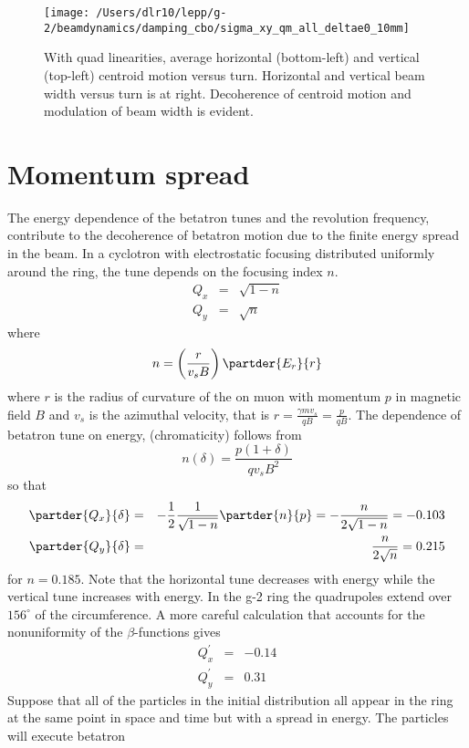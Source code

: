 \documentclass[10pt]{report}
\begin{document}
\begin{figure}[htbp] %
   \centering
   \texttt{[image: /Users/dlr10/lepp/g-2/beamdynamics/damping\_cbo/sigma\_xy\_qm\_all\_deltae0\_10mm]} 
   \caption{ With quad linearities, average horizontal (bottom-left) and vertical (top-left) centroid motion versus turn.
Horizontal and vertical beam width versus turn is at right. Decoherence of centroid motion and modulation of beam width is evident.\label{dist_mp}}
\end{figure}
\newpage
\section*{Momentum spread}
The energy dependence of the betatron tunes and the revolution frequency, contribute to the decoherence of betatron motion due to the finite energy spread in the beam.
In a cyclotron with electrostatic focusing
distributed uniformly around the ring,
the tune depends on the focusing index $n$. 
\begin{eqnarray*}
Q_x &=& \sqrt{1-n}\\
Q_y &=& \sqrt{n}
\end{eqnarray*}
where $$n =\left(\frac{r}{v_s B}\right)\partder{E_r}{r}$$
where $r$ is the radius of curvature of the on muon with momentum $p$ in magnetic field $B$ and $v_s$ is the azimuthal
velocity, that is $r = \frac{\gamma m v_s}{q B} = \frac{p}{qB}$.
The dependence of betatron tune on energy, (chromaticity) follows from
$$n(\delta) = \frac{p(1+\delta)}{qv_s B^2}$$ so
that
\begin{eqnarray*}
\partder{Q_x}{\delta} &=&-\frac{1}{2}\frac{1}{ \sqrt{1-n}}\partder{n}{p} = -\frac{n}{2\sqrt{1-n}} =-0.103\\
\partder{Q_y}{\delta} &=& \frac{n}{2\sqrt{n}} = 0.215 
\end{eqnarray*}
for $n=0.185$.
Note that the horizontal tune decreases with energy while the vertical tune increases with energy.
In the g-2 ring the quadrupoles extend over $156^{\circ}$ of the circumference.
A more careful calculation that accounts for the nonuniformity of the $\beta$-functions gives
\begin{eqnarray*}
Q^\prime_x&=& -0.14\\
Q^\prime_y&=& 0.31
\end{eqnarray*}
Suppose that all of the particles in the initial distribution all appear in the ring at the
same point in space and time but with a spread in energy. The particles will execute betatron
\end{document}
